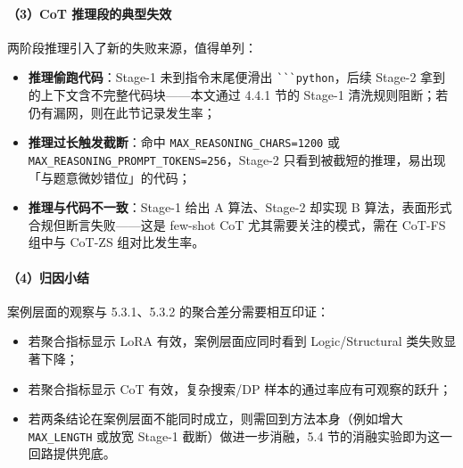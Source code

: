 \paragraph{（3）CoT 推理段的典型失效}
两阶段推理引入了新的失败来源，值得单列：
\begin{itemize}
    \item \textbf{推理偷跑代码}：Stage-1 未到指令末尾便滑出 \verb|```python|，后续 Stage-2 拿到的上下文含不完整代码块——本文通过 4.4.1 节的 Stage-1 清洗规则阻断；若仍有漏网，则在此节记录发生率；
    \item \textbf{推理过长触发截断}：命中 \texttt{MAX\_REASONING\_CHARS=1200} 或 \texttt{MAX\_REASONING\_PROMPT\_TOKENS=256}，Stage-2 只看到被截短的推理，易出现「与题意微妙错位」的代码；
    \item \textbf{推理与代码不一致}：Stage-1 给出 A 算法、Stage-2 却实现 B 算法，表面形式合规但断言失败——这是 few-shot CoT 尤其需要关注的模式，需在 CoT-FS 组中与 CoT-ZS 组对比发生率。
\end{itemize}

\paragraph{（4）归因小结}
案例层面的观察与 5.3.1、5.3.2 的聚合差分需要相互印证：
\begin{itemize}
    \item 若聚合指标显示 LoRA 有效，案例层面应同时看到 Logic/Structural 类失败显著下降；
    \item 若聚合指标显示 CoT 有效，复杂搜索/DP 样本的通过率应有可观察的跃升；
    \item 若两条结论在案例层面不能同时成立，则需回到方法本身（例如增大 \texttt{MAX\_LENGTH} 或放宽 Stage-1 截断）做进一步消融，5.4 节的消融实验即为这一回路提供兜底。
\end{itemize}
